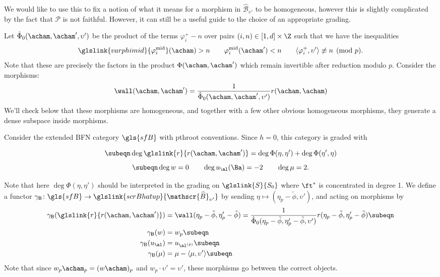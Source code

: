 We would like to use this to fix a notion of what it means
for a morphism in $\widehat{\mathscr{B}}_{\upsilon'}$ to be
homogeneous, however this is slightly complicated by the fact that
$\mathscr{P}$ is not faithful.  However, it can still be a useful guide
to the choice of an appropriate grading.  

Let $\hat \Phi_0(\acham,\acham',\upsilon')$ be the product of the terms
$\varphi^+_i-n$  over pairs $(i,n) \in [1,d]\times\Z$ such that we have the inequalities
\[\glslink{varphimid}{\varphi_i^{\operatorname{mid}}}(\acham)>n\qquad \varphi_i^{\operatorname{mid}}(\acham')<n \qquad
\langle\varphi^+_i,\upsilon'\rangle\not\equiv n\pmod p.\]  Note that these are precisely the factors in the product $\Phi(\acham,\acham')$ which remain invertible after reduction modulo $p$.  
Consider the morphisms:
  \begin{equation*}
  \wall(\acham,\acham')=
                            \frac{1}{\hat{\Phi}_0(\acham,\acham',\upsilon')}r(\acham,\acham)
 \end{equation*}
We'll check below that these morphisms are homogeneous, and together
with a few other obvious homogeneous morphisms, they generate a dense
subspace inside morphisms.






Consider the extended BFN category $\gls{sfB}$ with \gls{pthroot} conventions.  Since $h=0$, this category is graded with   
\begin{samepage}
    \newseq\begin{equation*}\subeqn
    \label{eq:Stein-grading1}
\deg \glslink{r}{r(\acham,\acham')}=\deg \Phi(\eta,\eta')+\deg \Phi(\eta',\eta)
\end{equation*}\begin{equation*}\subeqn
\deg w=0\qquad \deg u_\al(\Ba)=-2 \qquad  \deg
  \mu=2\label{eq:Stein-grading2}.
\end{equation*}
\end{samepage}
Note that here $\deg \Phi(\eta,\eta')$ should be interpreted in the grading on $\glslink{S}{S_0}$ where $\ft^*$ is concentrated in degree 1.  
We define a functor $\gamma_{\mathsf{B}}\colon \gls{sfB}\to
\glslink{scrBhatup}{\mathscr{\widehat{B}}_{\upsilon'}}$ by sending
$\eta\mapsto (\eta_p-\tilde{\phi},
\upsilon')$, and acting on morphisms by 
\newseq 
  \begin{align*}
    \gamma_{\mathsf{B}}(\glslink{r}{r(\acham,\acham')})&=\wall(\eta_p-\tilde{\phi},\eta_p'-\tilde{\phi})= \frac{1}{\hat{\Phi}_0(\eta_p-\tilde{\phi},\eta_p'-\tilde{\phi},\upsilon')}r(\eta_p-\tilde{\phi},\eta_p'-\tilde{\phi})\subeqn \label{gamma1}\\
    \gamma_{\mathsf{B}} (w)&= w_p \subeqn \label{gamma2}\\
    \gamma_{\mathsf{B}}(u_\al) &=u_{\al^{(p)}}\subeqn \label{gamma3}\\
    \gamma_{\mathsf{B}}(\mu)&= \mu-\langle\mu,\upsilon'\rangle \subeqn \label{gamma4}
  \end{align*}
Note that since $w_p\acham_p=(w\acham)_p$ and $w_p\cdot \upsilon'=\upsilon'$, these morphisms go
between the correct objects.

